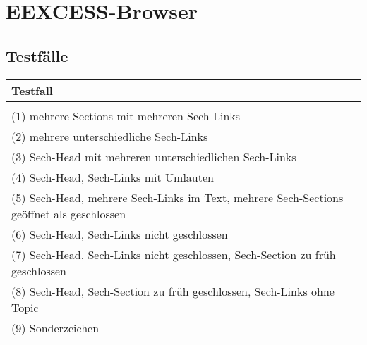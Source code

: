 \chapter{EEXCESS-Browser}

\section{Testfälle}

\begin{tabular}{|l|l|}
\hline 
Testfall &  \\ 
\hline 
 &  \\ 
\hline 
(1) mehrere Sections mit mehreren Sech-Links &   \\ 
\hline 
(2) mehrere unterschiedliche Sech-Links &  \\ 
\hline 
(3) Sech-Head mit mehreren unterschiedlichen Sech-Links &  \\ 
\hline
(4) Sech-Head, Sech-Links mit Umlauten &  \\ 
\hline
(5) Sech-Head, mehrere Sech-Links im Text, mehrere Sech-Sections geöffnet als geschlossen &  \\ 
\hline
(6) Sech-Head, Sech-Links nicht geschlossen &  \\ 
\hline
(7) Sech-Head, Sech-Links nicht geschlossen, Sech-Section zu früh geschlossen &  \\ 
\hline
(8) Sech-Head, Sech-Section zu früh geschlossen, Sech-Links ohne Topic &  \\ 
\hline
(9) Sonderzeichen  &  \\ 
\hline


\end{tabular} 




